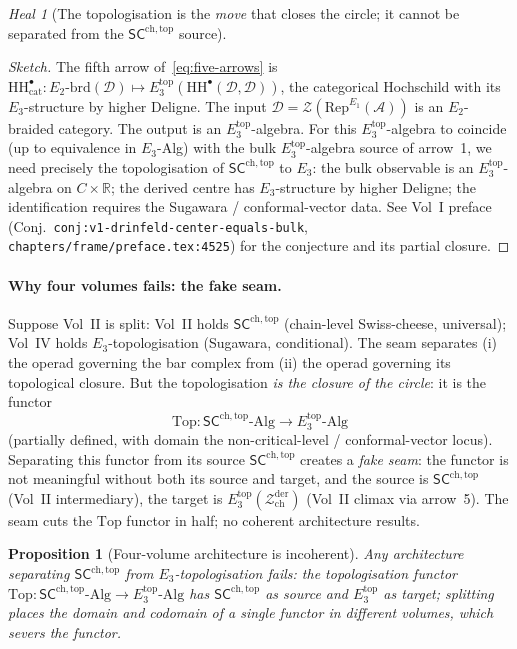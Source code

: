 \documentclass[11pt]{article}
\newtheorem{prop}[thm]{Proposition}
\theoremstyle{definition}
\theoremstyle{remark}
\newtheorem{heal}[thm]{Heal}
\newcommand{\bR}{\mathbb{R}}
\newcommand{\cA}{\mathcal{A}}
\newcommand{\cD}{\mathcal{D}}
\newcommand{\cZ}{\mathcal{Z}}
\newcommand{\Rep}{\mathrm{Rep}}
\newcommand{\HH}{\mathrm{HH}}
\newcommand{\Zder}{\cZ^{\mathrm{der}}_{\mathrm{ch}}}
\newcommand{\SCchtop}{\mathsf{SC}^{\mathrm{ch,top}}}
\newcommand{\Eone}{E_1}
\newcommand{\Etwo}{E_2}
\newcommand{\Ethree}{E_3}
\begin{document}
\begin{heal}[The topologisation is the \emph{move} that closes the
circle; it cannot be separated from the $\SCchtop$ source]
\begin{proof}[Sketch]
The fifth arrow of~\eqref{eq:five-arrows} is
$\HH^\bullet_{\mathrm{cat}}\colon \Etwo\text{-brd}(\cD) \mapsto
\Ethree^{\mathrm{top}}(\HH^\bullet(\cD, \cD))$, the categorical
Hochschild with its $\Ethree$-structure by higher Deligne. The
input $\cD = \cZ(\Rep^{\Eone}(\cA))$ is an $\Etwo$-braided category.
The output is an $\Ethree^{\mathrm{top}}$-algebra. For this
$\Ethree^{\mathrm{top}}$-algebra to coincide (up to equivalence in
$\Ethree$-Alg) with the bulk $\Ethree^{\mathrm{top}}$-algebra
source of arrow~1, we need precisely the topologisation of
$\SCchtop$ to $\Ethree$: the bulk observable is an
$\Ethree^{\mathrm{top}}$-algebra on $C \times \bR$; the derived
centre has $\Ethree$-structure by higher Deligne; the
identification requires the Sugawara / conformal-vector data.
See Vol~I preface (Conj.~\texttt{conj:v1-drinfeld-center-equals-bulk},
\texttt{chapters/frame/preface.tex:4525}) for the conjecture and
its partial closure.
\end{proof}

\paragraph{Why four volumes fails: the fake seam.}
Suppose Vol~II is split: Vol~II holds $\SCchtop$ (chain-level
Swiss-cheese, universal); Vol~IV holds $\Ethree$-topologisation
(Sugawara, conditional). The seam separates (i) the operad
governing the bar complex from (ii) the operad governing its
topological closure. But the topologisation \emph{is the closure
of the circle}: it is the functor
\[
\mathrm{Top}\colon \SCchtop\text{-Alg} \to
\Ethree^{\mathrm{top}}\text{-Alg}
\]
(partially defined, with domain the non-critical-level /
conformal-vector locus). Separating this functor from its source
$\SCchtop$ creates a \emph{fake seam}: the functor is not
meaningful without both its source and target, and the source is
$\SCchtop$ (Vol~II intermediary), the target is
$\Ethree^{\mathrm{top}}(\Zder)$ (Vol~II climax via arrow~5). The
seam cuts the $\mathrm{Top}$ functor in half; no coherent
architecture results.

\begin{prop}[Four-volume architecture is incoherent]
\label{prop:four-volume-incoherent}
Any architecture separating $\SCchtop$ from $\Ethree$-topologisation
fails: the topologisation functor
$\mathrm{Top}\colon \SCchtop\text{-Alg} \to \Ethree^{\mathrm{top}}\text{-Alg}$
has $\SCchtop$ as source and $\Ethree^{\mathrm{top}}$ as target;
splitting places the domain and codomain of a single functor in
different volumes, which severs the functor.
\end{prop}


\end{heal}
\end{document}
